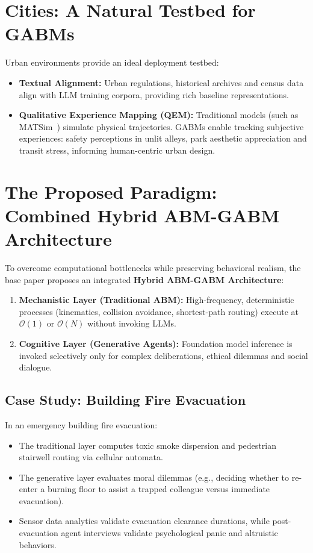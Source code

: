 \documentclass[12pt,a4paper]{report}
\begin{document}
\section{Cities: A Natural Testbed for GABMs}
\label{sec:cities_testbed}

Urban environments provide an ideal deployment testbed:
\begin{itemize}
    \item \textbf{Textual Alignment:} Urban regulations, historical archives and census data align with LLM training corpora, providing rich baseline representations.
    \item \textbf{Qualitative Experience Mapping (QEM):} Traditional models (such as MATSim~\cite{matsim2016}) simulate physical trajectories. GABMs enable tracking subjective experiences: safety perceptions in unlit alleys, park aesthetic appreciation and transit stress, informing human-centric urban design.
\end{itemize}

\section{The Proposed Paradigm: Combined Hybrid ABM-GABM Architecture}
\label{sec:hybrid_architecture}

To overcome computational bottlenecks while preserving behavioral realism, the base paper proposes an integrated \textbf{Hybrid ABM-GABM Architecture}:
\begin{enumerate}[label=\arabic*.]
    \item \textbf{Mechanistic Layer (Traditional ABM):} High-frequency, deterministic processes (kinematics, collision avoidance, shortest-path routing) execute at $\mathcal{O}(1)$ or $\mathcal{O}(N)$ without invoking LLMs.
    \item \textbf{Cognitive Layer (Generative Agents):} Foundation model inference is invoked selectively only for complex deliberations, ethical dilemmas and social dialogue.
\end{enumerate}

\subsection{Case Study: Building Fire Evacuation}
In an emergency building fire evacuation:
\begin{itemize}
    \item The traditional layer computes toxic smoke dispersion and pedestrian stairwell routing via cellular automata.
    \item The generative layer evaluates moral dilemmas (e.g., deciding whether to re-enter a burning floor to assist a trapped colleague versus immediate evacuation).
    \item Sensor data analytics validate evacuation clearance durations, while post-evacuation agent interviews validate psychological panic and altruistic behaviors.
\end{itemize}
\end{document}
